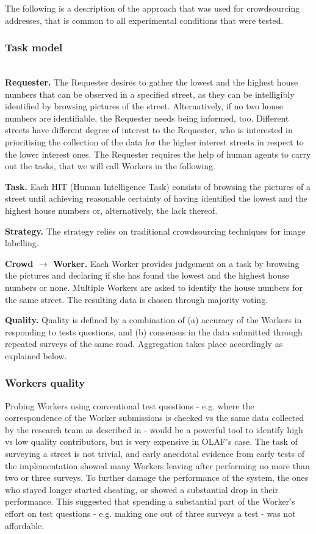 The following is a description of the approach that was used for crowdsourcing addresses, that is common to all experimental conditions that were tested.

\subsubsection{Task model} \leavevmode \\ %

\textbf{Requester.} The Requester desires to gather the lowest and the highest house numbers that can be observed in a specified street, as they can be intelligibly identified by browsing pictures of the street. Alternatively, if no two house numbers are identifiable, the Requester needs being informed, too. Different streets have different degree of interest to the Requester, who is interested in prioritising the collection of the data for the higher interest streets in respect to the lower interest ones. The Requester requires the help of human agents to carry out the tasks, that we will call Workers in the following.

\textbf{Task.} Each HIT (Human Intelligence Task) consists of browsing the pictures of a street until achieving reasonable certainty of having identified the lowest and the highest house numbers or, alternatively, the lack thereof.

\textbf{Strategy.} 
The strategy relies on traditional crowdsourcing techniques for image labelling.

\textbf{Crowd $\rightarrow$ Worker.} Each Worker provides judgement on a task by browsing the pictures and declaring if she has found the lowest and the highest house numbers or none. Multiple Workers are asked to identify the house numbers for the same street. The resulting data is chosen through majority voting.

\textbf{Quality.} Quality is defined by a combination of (a) accuracy of the Workers in responding to tests questions, and (b) consensus in the data submitted through repeated surveys of the same road. Aggregation takes place accordingly as explained below.

\subsubsection{Workers quality}
    
Probing Workers using conventional test questions - e.g. where the correspondence of the Worker submissions is checked vs the same data collected by the research team as described in \cite{Kittur:2008gj} - would be a powerful tool to identify high vs low quality contributors, but is very expensive in OLAF's case. The task of surveying a street is not trivial, and early anecdotal evidence from early tests of the implementation showed many Workers leaving after performing no more than two or three surveys. To further damage the performance of the system, the ones who stayed longer started cheating, or showed a substantial drop in their performance. This suggested that spending a substantial part of the Worker's effort on test questions - e.g. making one out of three surveys a test - was not affordable.

